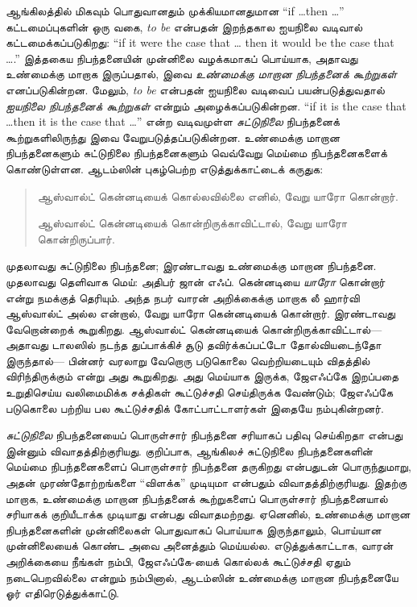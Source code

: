 \documentclass[../../../include/open-logic-section]{subfiles}
\begin{document}


ஆங்கிலத்தில் மிகவும் பொதுவானதும் முக்கியமானதுமான ``if \dots then
\dots'' கட்டமைப்புகளின் ஒரு வகை, \emph{to be} என்பதன் இறந்தகால
ஐயநிலை வடிவால் கட்டமைக்கப்படுகிறது: ``if it were the case that \dots
then it would be the case that \dots.'' இத்தகைய நிபந்தனையின் முன்னிலை
வழக்கமாகப் பொய்யாக, அதாவது உண்மைக்கு மாறாக இருப்பதால், இவை
\emph{உண்மைக்கு மாறான நிபந்தனைக் கூற்றுகள்} எனப்படுகின்றன. மேலும்,
\emph{to be} என்பதன் ஐயநிலை வடிவைப் பயன்படுத்துவதால் \emph{ஐயநிலை
நிபந்தனைக் கூற்றுகள்} என்றும் அழைக்கப்படுகின்றன. ``if it is the case
that \dots then it is the case that \dots'' என்ற வடிவமுள்ள
\emph{சுட்டுநிலை} நிபந்தனைக் கூற்றுகளிலிருந்து இவை வேறுபடுத்தப்படுகின்றன.
உண்மைக்கு மாறான நிபந்தனைகளும் சுட்டுநிலை நிபந்தனைகளும் வெவ்வேறு மெய்மை
நிபந்தனைகளைக் கொண்டுள்ளன. ஆடம்ஸின் புகழ்பெற்ற எடுத்துக்காட்டைக் கருதுக:
\begin{quote}
  ஆஸ்வால்ட் கென்னடியைக் கொல்லவில்லை எனில், வேறு யாரோ கொன்றார்.

  ஆஸ்வால்ட் கென்னடியைக் கொன்றிருக்காவிட்டால், வேறு யாரோ கொன்றிருப்பார்.
\end{quote}
முதலாவது சுட்டுநிலை நிபந்தனை; இரண்டாவது உண்மைக்கு மாறான நிபந்தனை.
முதலாவது தெளிவாக மெய்: அதிபர் ஜான் எஃப். கென்னடியை \emph{யாரோ}
கொன்றார் என்று நமக்குத் தெரியும். அந்த நபர் வாரன் அறிக்கைக்கு மாறாக லீ
ஹார்வி ஆஸ்வால்ட் அல்ல என்றால், வேறு யாரோ கென்னடியைக் கொன்றார். இரண்டாவது
வேறொன்றைக் கூறுகிறது. ஆஸ்வால்ட் கென்னடியைக் கொன்றிருக்காவிட்டால்---அதாவது
டாலஸில் நடந்த துப்பாக்கிச் சூடு தவிர்க்கப்பட்டோ தோல்வியடைந்தோ இருந்தால்---
பின்னர் வரலாறு வேறொரு படுகொலை வெற்றியடையும் விதத்தில் விரிந்திருக்கும்
என்று அது கூறுகிறது. அது மெய்யாக இருக்க, ஜேஎஃப்கே இறப்பதை உறுதிசெய்ய
வலிமைமிக்க சக்திகள் கூட்டுச்சதி செய்திருக்க வேண்டும்; ஜேஎஃப்கே படுகொலை
பற்றிய பல கூட்டுச்சதிக் கோட்பாட்டாளர்கள் இதையே நம்புகின்றனர்.

\emph{சுட்டுநிலை} நிபந்தனையைப் பொருள்சார் நிபந்தனை சரியாகப் பதிவு
செய்கிறதா என்பது இன்னும் விவாதத்திற்குரியது. குறிப்பாக, ஆங்கிலச்
சுட்டுநிலை நிபந்தனைகளின் மெய்மை நிபந்தனைகளைப் பொருள்சார் நிபந்தனை
தருகிறது என்பதுடன் பொருந்துமாறு, அதன் முரண்தோற்றங்களை ``விளக்க'' முடியுமா
என்பதும் விவாதத்திற்குரியது. இதற்கு மாறாக, உண்மைக்கு மாறான நிபந்தனைக்
கூற்றுகளைப் பொருள்சார் நிபந்தனையால் சரியாகக் குறியீடாக்க முடியாது என்பது
விவாதமற்றது. ஏனெனில், உண்மைக்கு மாறான நிபந்தனைகளின் முன்னிலைகள் பொதுவாகப்
பொய்யாக இருந்தாலும், பொய்யான முன்னிலையைக் கொண்ட அவை அனைத்தும் மெய்யல்ல.
எடுத்துக்காட்டாக, வாரன் அறிக்கையை நீங்கள் நம்பி, ஜேஎஃப்கே-யைக் கொல்லக்
கூட்டுச்சதி ஏதும் நடைபெறவில்லை என்றும் நம்பினால், ஆடம்ஸின் உண்மைக்கு
மாறான நிபந்தனையே ஓர் எதிரெடுத்துக்காட்டு.
\end{document}
